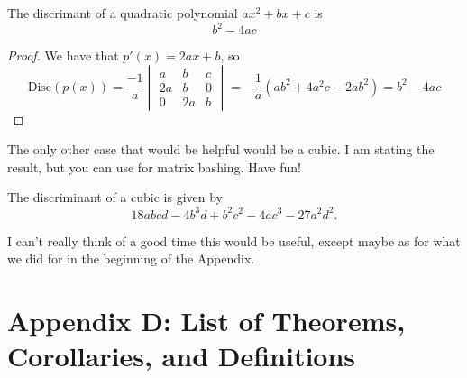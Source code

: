 \documentclass[11pt,titlepage]{scrartcl}
\renewcommand{\listtheoremname}{List of Theorems}
\begin{document}
\begin{corollary}
The discrimant of a quadratic polynomial $ax^2+bx+c$ is
\[b^2-4ac\]
\end{corollary}
\begin{proof}
We have that $p'(x)=2ax+b$, so
\[\text{Disc}(p(x))=\dfrac{-1}{a}\begin{vmatrix}a&b&c\\2a&b&0\\0&2a&b\end{vmatrix}=-\dfrac{1}{a}(ab^2+4a^2c-2ab^2)=b^2-4ac\]
\end{proof}
The only other case that would be helpful would be a cubic. I am stating the result, but you can use  for matrix bashing. Have fun!
\begin{theorem}
The discriminant of a cubic is given by
\[18abcd-4b^3d + b^2c^2-4ac^3-27a^2d^2.\]
\end{theorem}
I can't really think of a good time this would be useful, except maybe as for what we did for  in the beginning of the Appendix.

\section{Appendix D: List of Theorems, Corollaries, and Definitions}
\listoftheorems[ignoreall,show={theorem}]
\renewcommand{\listtheoremname}{List of Corollaries}
\listoftheorems[ignoreall,show={corollary}]
\renewcommand{\listtheoremname}{List of Definitions}
\listoftheorems[ignoreall,show={defn}]
\end{document}
